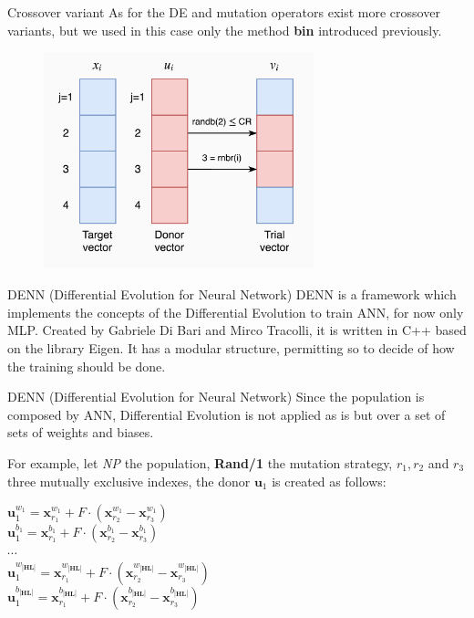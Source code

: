\documentclass[xcolor={usenames}]{beamer}
\begin{document}
  \begin{frame}{Crossover variant}
	As for the DE and mutation operators exist more crossover variants, but we used in this case only the method \textbf{bin} introduced previously.
	\begin{figure}
		\centering
		\includegraphics[width=0.7\textwidth]{../figures/bin-4.png}
	\end{figure}
  \end{frame}
  \begin{frame}{DENN (Differential Evolution for Neural Network)}
  	DENN is a framework which implements the concepts of the Differential Evolution to train ANN, for now only MLP. Created by Gabriele Di Bari and Mirco Tracolli, it is written in C++ based on the library Eigen. It has a modular structure, permitting so to decide of how the training should be done.
  \end{frame}
  \begin{frame}{	DENN (Differential Evolution for Neural Network)}
  	Since the population is composed by ANN, Differential Evolution is not applied as is but over a set of sets of weights and biases. 
  	
  	For example, let \textit{NP} the population, \textbf{Rand/1} the mutation strategy, $r_1, r_2$ and $r_3$ three mutually exclusive indexes, the donor $\textbf{u}_{1}$ is created as follows:
	\begin{center}
		$\textbf{u}_{1}^{w_1} = \textbf{x}_{r_1}^{w_1} + F \cdot (\textbf{x}_{r_2}^{w_1} - \textbf{x}_{r_3}^{w_1})$\\
		$\textbf{u}_{1}^{b_1} = \textbf{x}_{r_1}^{b_1} + F \cdot (\textbf{x}_{r_2}^{b_1} - \textbf{x}_{r_3}^{b_1})$\\
		$\cdots$\\
		$\textbf{u}_{1}^{w_{|\textbf{HL}|}} = \textbf{x}_{r_1}^{w_{|\textbf{HL}|}} + F \cdot (\textbf{x}_{r_2}^{w_{|\textbf{HL}|}} - \textbf{x}_{r_3}^{w_{|\textbf{HL}|}})$\\
		$\textbf{u}_{1}^{b_{|\textbf{HL}|}} = \textbf{x}_{r_1}^{b_{|\textbf{HL}|}} + F \cdot (\textbf{x}_{r_2}^{b_{|\textbf{HL}|}} - \textbf{x}_{r_3}^{b_{|\textbf{HL}|}})$\\
	\end{center}
  \end{frame}
\end{document}
